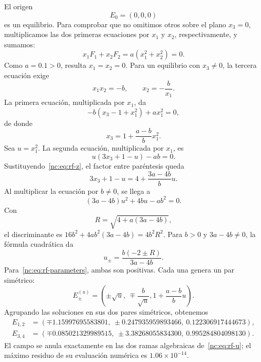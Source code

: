 El origen
\begin{equation}
 E_0=(0,0,0)
\end{equation}
es un equilibrio. Para comprobar que no omitimos otros sobre el plano
\(x_3=0\), multiplicamos las dos primeras ecuaciones por \(x_1\) y
\(x_2\), respectivamente, y sumamos:
\[
 x_1F_1+x_2F_2=a(x_1^2+x_2^2)=0.
\]
Como \(a=0.1>0\), resulta \(x_1=x_2=0\). Para un equilibrio con
\(x_3\neq0\), la tercera ecuación exige
\begin{equation}
 x_1x_2=-b,\qquad x_2=-\frac{b}{x_1}.
 \label{nc:eq:rf-product}
\end{equation}
La primera ecuación, multiplicada por \(x_1\), da
\begin{equation}
 -b(x_3-1+x_1^2)+a x_1^2=0,
\end{equation}
de donde
\begin{equation}
 x_3=1+\frac{a-b}{b}x_1^2.
 \label{nc:eq:rf-z}
\end{equation}
Sea \(u=x_1^2\). La segunda ecuación, multiplicada por \(x_1\), es
\begin{equation}
 u(3x_3+1-u)-ab=0.
\end{equation}
Sustituyendo~\eqref{nc:eq:rf-z}, el factor entre paréntesis queda
\[
 3x_3+1-u=4+\frac{3a-4b}{b}u.
\]
Al multiplicar la ecuación por \(b\ne0\), se llega a
\begin{equation}
 (3a-4b)u^2+4bu-ab^2=0.
 \label{nc:eq:rf-u-polynomial}
\end{equation}
Con
\begin{equation}
 R=\sqrt{4+a(3a-4b)},
\end{equation}
el discriminante es \(16b^2+4ab^2(3a-4b)=4b^2R^2\).
Para \(b>0\) y \(3a-4b\ne0\), la fórmula cuadrática da
\begin{equation}
 u_{\pm}=\frac{b(-2\pm R)}{3a-4b}.
 \label{nc:eq:rf-u}
\end{equation}
Para~\eqref{nc:eq:rf-parameters}, ambas son positivas. Cada una genera un par
simétrico:
\begin{equation}
 E_{\pm}^{(u)}=\left(
 \pm\sqrt u,\ \mp\frac{b}{\sqrt u},
 1+\frac{a-b}{b}u
 \right).
 \label{nc:eq:rf-equilibria-general}
\end{equation}
Agrupando las soluciones en sus dos pares simétricos, obtenemos
\begin{align}
 E_{1,2}&=(\mp1.15997695583801,
 \ \pm0.247935959893466,
 \ 0.122306917444673),
 \label{nc:eq:rf-e12}\\
 E_{3,4}&=(\mp0.085021329989515,
 \ \pm3.38268055834300,
 \ 0.995284804098130).
 \label{nc:eq:rf-e34}
\end{align}
El campo se anula exactamente en las dos ramas
algebraicas de~\eqref{nc:eq:rf-u}; el máximo residuo de su evaluación numérica es
\(1.06\times10^{-14}\).

